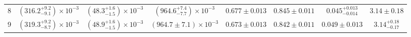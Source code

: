 \begin{landscape}
\begin{table}
{\begin{tabular}{c|ccccccc}
		8 & $\left( 316.2^{+9.2}_{-9.1} \right) \times 10^{-3}$ & $\left( 48.3^{+1.6}_{-1.5} \right) \times 10^{-3}$ & $\left( 964.6^{+7.4}_{-7.7} \right) \times 10^{-3}$ & $0.677\pm 0.013$ & $0.845\pm 0.011$ & $0.045^{+0.013}_{-0.014}$ & $3.14\pm 0.18$ \\ 
		9 & $\left( 319.3^{+9.2}_{-8.7} \right) \times 10^{-3}$ & $\left( 48.9^{+1.6}_{-1.5} \right) \times 10^{-3}$ & $\left( 964.7\pm 7.1 \right) \times 10^{-3}$ & $0.673\pm 0.013$ & $0.842\pm 0.011$ & $0.049\pm 0.013$ & $3.14^{+0.18}_{-0.17}$ \\ 
		\hline
		\hline
    \end{tabular}}
\end{table}
\end{landscape}
